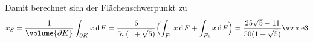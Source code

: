 \documentclass[../full]{subfiles}
\begin{document}
    Damit berechnet sich der Fl\"achenschwerpunkt zu
    \begin{equation*}
        x_S = \frac{1}{\volume{\partial K}} \int_{\partial K} x \dF
        = \frac{6}{5 \pi \paren{1 + \sqrt{5}}}
        \paren[\Big]{\int_{F_1} x \dF + \int_{F_2} x \dF}
        = \frac{25 \sqrt{5} - 11}{50 \paren{1 + \sqrt{5}}} \StandardVect{3}
    \end{equation*}
\end{document}
